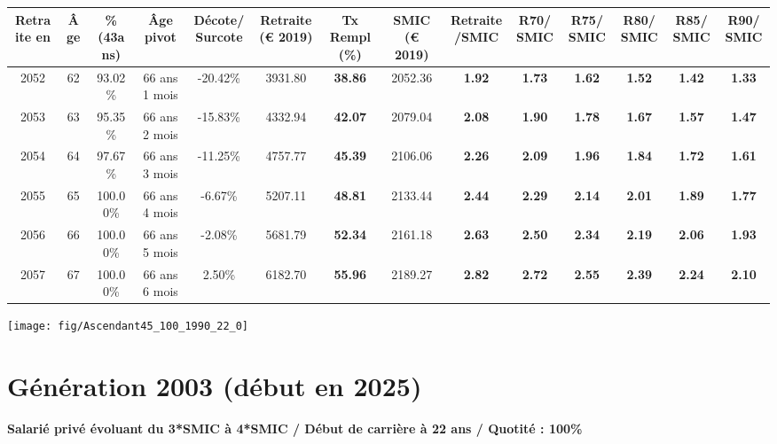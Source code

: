 \begin{adjustbox}{max width=\textwidth} 
\begin{tabular}[htb]{|c|c||c|c|c||c|c||c|c||c|c|c|c|c|} 
\hline 
 Retraite en &  Âge &  \%(43ans) &  Âge pivot &  Décote/Surcote &  Retraite (\euro{} 2019) &  Tx Rempl(\%) &  SMIC (\euro{} 2019) &  Retraite/SMIC &  R70/SMIC &  R75/SMIC &  R80/SMIC &  R85/SMIC &  R90/SMIC \\ 
\hline \hline 
 2052 &  62 &  93.02\% &  66 ans 1 mois &  -20.42\% &  3931.80 &  {\bf 38.86} &  2052.36 &  {\bf 1.92} &  {\bf 1.73} &  {\bf 1.62} &  {\bf 1.52} &  {\bf 1.42} &  {\bf 1.33} \\ 
\hline 
 2053 &  63 &  95.35\% &  66 ans 2 mois &  -15.83\% &  4332.94 &  {\bf 42.07} &  2079.04 &  {\bf 2.08} &  {\bf 1.90} &  {\bf 1.78} &  {\bf 1.67} &  {\bf 1.57} &  {\bf 1.47} \\ 
\hline 
 2054 &  64 &  97.67\% &  66 ans 3 mois &  -11.25\% &  4757.77 &  {\bf 45.39} &  2106.06 &  {\bf 2.26} &  {\bf 2.09} &  {\bf 1.96} &  {\bf 1.84} &  {\bf 1.72} &  {\bf 1.61} \\ 
\hline 
 2055 &  65 &  100.00\% &  66 ans 4 mois &  -6.67\% &  5207.11 &  {\bf 48.81} &  2133.44 &  {\bf 2.44} &  {\bf 2.29} &  {\bf 2.14} &  {\bf 2.01} &  {\bf 1.89} &  {\bf 1.77} \\ 
\hline 
 2056 &  66 &  100.00\% &  66 ans 5 mois &  -2.08\% &  5681.79 &  {\bf 52.34} &  2161.18 &  {\bf 2.63} &  {\bf 2.50} &  {\bf 2.34} &  {\bf 2.19} &  {\bf 2.06} &  {\bf 1.93} \\ 
\hline 
 2057 &  67 &  100.00\% &  66 ans 6 mois &  2.50\% &  6182.70 &  {\bf 55.96} &  2189.27 &  {\bf 2.82} &  {\bf 2.72} &  {\bf 2.55} &  {\bf 2.39} &  {\bf 2.24} &  {\bf 2.10} \\ 
\hline 
\hline 
\end{tabular} 
\end{adjustbox} 
 
 \vspace{0.1cm} 

 {\hspace{-2.2cm}\texttt{[image: fig/Ascendant45\_100\_1990\_22\_0]}} 

\newpage 
 
\section{Génération 2003 (début en 2025)\label{Ascendant45_100_2003_22_0}} 
 
{\bf \noindent Salarié privé évoluant du 3*SMIC à 4*SMIC / Début de carrière à 22 ans / Quotité : 100\%}  ~ 

